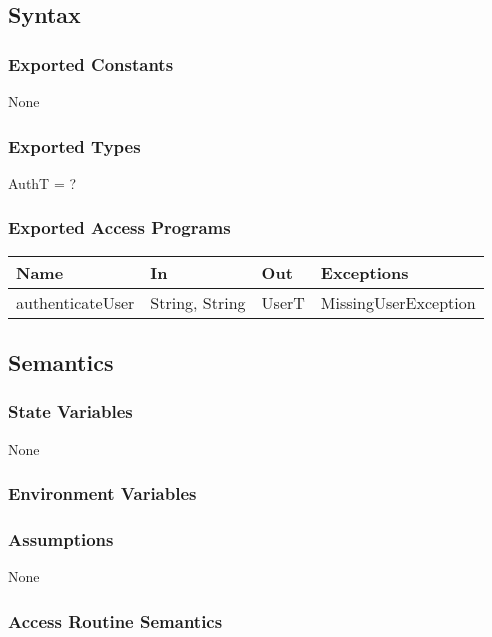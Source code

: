 \documentclass[12pt, titlepage]{article}
\begin{document}
\subsection{Syntax}

\subsubsection{Exported Constants}
None

\subsubsection{Exported Types}
AuthT = ?

\subsubsection{Exported Access Programs}

\begin{tabular}{p{4cm} p{4cm} p{2cm} p{4cm}}
\hline
\textbf{Name} & \textbf{In} & \textbf{Out} & \textbf{Exceptions} \\
\hline
authenticateUser & String, String & UserT & MissingUserException \\
\hline
\end{tabular}

\subsection{Semantics}

\subsubsection{State Variables}
None

\subsubsection{Environment Variables}

\subsubsection{Assumptions}
None

\subsubsection{Access Routine Semantics}
\end{document}
